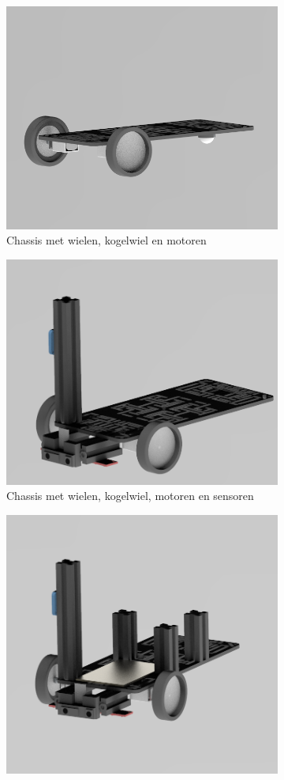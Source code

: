 \documentclass[a4paper,twoside,kulak]{kulakreport} %
\begin{document}
\begin{figure}[ht] 
	\begin{subfigure}[b]{0.5\linewidth}
		\centering
		\includegraphics[width=0.75\linewidth]{1chassisaAndrijving} 
		\caption{Chassis met wielen, kogelwiel en motoren} 
		\label{opbouw1} 
		\vspace{4ex}
	\end{subfigure}%
	\begin{subfigure}[b]{0.5\linewidth}
		\centering
		\includegraphics[width=0.75\linewidth]{2sensoren} 
		\caption{Chassis met wielen, kogelwiel, motoren en sensoren} 
		\label{opbouw2} 
		\vspace{4ex}
	\end{subfigure} 
	\begin{subfigure}[b]{0.5\linewidth}
		\centering
		\includegraphics[width=0.75\linewidth]{3voorlaatste} 

\end{subfigure}
\end{figure}
\end{document}
